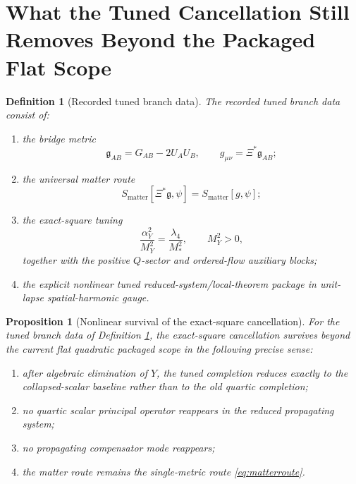 \documentclass[11pt]{article}
\newcommand{\BridgeMetric}{\mathfrak{g}}
\newtheorem{definition}{Definition}
\newtheorem{proposition}{Proposition}
\begin{document}
\section{What the Tuned Cancellation Still Removes Beyond the Packaged Flat Scope}

\begin{definition}[Recorded tuned branch data]
\label{def:branch}
The \emph{recorded tuned branch data} consist of:
\begin{enumerate}
    \item the bridge metric
    \begin{equation}
    \BridgeMetric_{AB}=G_{AB}-2U_AU_B,
    \qquad
    g_{\mu\nu}=\Xi^\ast\BridgeMetric_{AB};
    \label{eq:bridge}
    \end{equation}
    \item the universal matter route
    \begin{equation}
    S_{\mathrm{matter}}[\Xi^\ast\BridgeMetric,\psi]
    =
    S_{\mathrm{matter}}[g,\psi];
    \label{eq:matterroute}
    \end{equation}
    \item the exact-square tuning
    \begin{equation}
    \frac{\alpha_Y^2}{M_Y^2}=\frac{\lambda_4}{M_*^2},
    \qquad
    M_Y^2>0,
    \label{eq:tuning}
    \end{equation}
    together with the positive \(Q\)-sector and ordered-flow auxiliary blocks;
    \item the explicit nonlinear tuned reduced-system/local-theorem package in unit-lapse spatial-harmonic gauge.
\end{enumerate}
\end{definition}

\begin{proposition}[Nonlinear survival of the exact-square cancellation]
\label{prop:survival}
For the tuned branch data of Definition \ref{def:branch}, the exact-square cancellation survives beyond the current flat quadratic packaged scope in the following precise sense:
\begin{enumerate}
    \item after algebraic elimination of \(Y\), the tuned completion reduces exactly to the collapsed-scalar baseline rather than to the old quartic completion;
    \item no quartic scalar principal operator reappears in the reduced propagating system;
    \item no propagating compensator mode reappears;
    \item the matter route remains the single-metric route \eqref{eq:matterroute}.
\end{enumerate}
\end{proposition}
\end{document}
